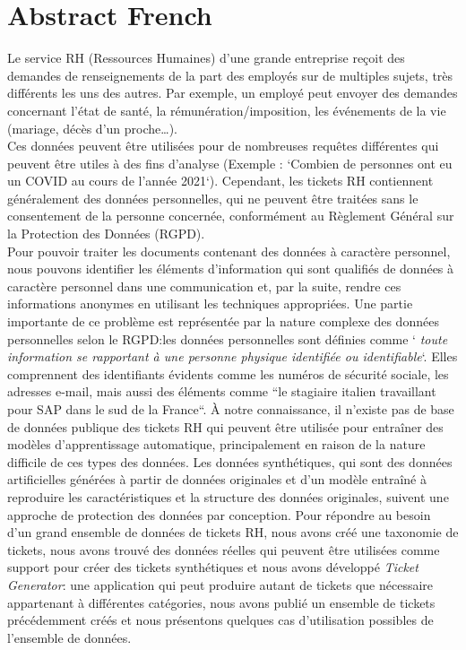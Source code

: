 \chapter*{Abstract French}

Le service RH (Ressources Humaines) d'une grande entreprise reçoit des demandes de renseignements de la part des employés sur de multiples sujets, très différents les uns des autres. Par exemple, un employé peut envoyer des demandes concernant l'état de santé, la rémunération/imposition, les événements de la vie (mariage, décès d'un proche\dots). \\
Ces données peuvent être utilisées pour de nombreuses requêtes différentes qui peuvent être utiles à des fins d'analyse (Exemple : `Combien de personnes ont eu un COVID au cours de l'année 2021`). Cependant, les tickets RH contiennent généralement des données personnelles, qui ne peuvent être traitées sans le consentement de la personne concernée, conformément au Règlement Général sur la Protection des Données (RGPD). \\
Pour pouvoir traiter les documents contenant des données à caractère personnel, nous pouvons identifier les éléments d'information qui sont qualifiés de données à caractère personnel dans une communication et, par la suite, rendre ces informations anonymes en utilisant les techniques appropriées.
Une partie importante de ce problème est représentée par la nature complexe des données personnelles selon le RGPD:\@ les données personnelles sont définies comme `\textit{  toute information se rapportant à une personne physique identifiée ou identifiable}`. Elles comprennent des identifiants évidents comme les numéros de sécurité sociale, les adresses e-mail, mais aussi des éléments comme ``le stagiaire italien travaillant pour SAP dans le sud de la France``.
À notre connaissance, il n'existe pas de base de données publique des tickets RH qui peuvent être utilisée pour entraîner des modèles d'apprentissage automatique, principalement en raison de la nature difficile de ces types des données. Les données synthétiques, qui sont des données artificielles générées à partir de données originales et d'un modèle entraîné à reproduire les caractéristiques et la structure des données originales, suivent une approche de protection des données par conception.
Pour répondre au besoin d'un grand ensemble de données de tickets RH, nous avons créé une taxonomie de tickets, nous avons trouvé des données réelles qui peuvent être utilisées comme support pour créer des tickets synthétiques et nous avons développé \textit{Ticket Generator}: une application qui peut produire autant de tickets que nécessaire appartenant à différentes catégories, nous avons publié un ensemble de tickets précédemment créés et nous présentons quelques cas d'utilisation possibles de l'ensemble de données.